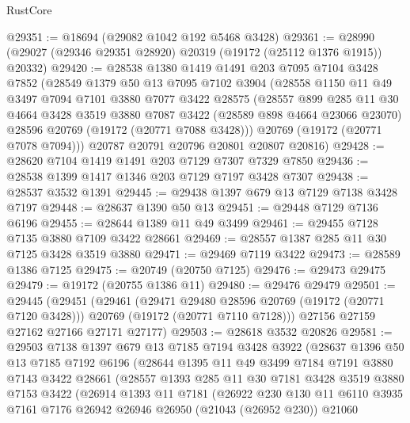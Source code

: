 \begin{lexlean}{RustCore}
\begin{coremodule}
@29351 := @18694 (@29082 @1042 @192 @5468 @3428)
@29361 := @28990 (@29027 (@29346 @29351 @28920) @20319 (@19172 (@25112 @1376 @1915)) @20332)
@29420 := @28538
    @1380
    @1419
    @1491
    @203
    @7095
    @7104
    @3428
    @7852
    (@28549
      @1379
      @50
      @13
      @7095
      @7102
      @3904
      (@28558
        @1150
        @11
        @49
        @3497
        @7094
        @7101
        @3880
        @7077
        @3422
        @28575
        (@28557
          @899
          @285
          @11
          @30
          @4664
          @3428
          @3519
          @3880
          @7087
          @3422
          (@28589 @898 @4664 @23066 @23070)
          @28596
          @20769
          (@19172 (@20771 @7088 @3428)))
        @20769
        (@19172 (@20771 @7078 @7094)))
      @20787
      @20791
      @20796
      @20801
      @20807
      @20816)
@29428 := @28620 @7104 @1419 @1491 @203 @7129 @7307 @7329 @7850
@29436 := @28538 @1399 @1417 @1346 @203 @7129 @7197 @3428 @7307
@29438 := @28537 @3532 @1391
@29445 := @29438 @1397 @679 @13 @7129 @7138 @3428 @7197
@29448 := @28637 @1390 @50 @13
@29451 := @29448 @7129 @7136 @6196
@29455 := @28644 @1389 @11 @49 @3499
@29461 := @29455 @7128 @7135 @3880 @7109 @3422 @28661
@29469 := @28557 @1387 @285 @11 @30 @7125 @3428 @3519 @3880
@29471 := @29469 @7119 @3422
@29473 := @28589 @1386 @7125
@29475 := @20749 (@20750 @7125)
@29476 := @29473 @29475
@29479 := @19172 (@20755 @1386 @11)
@29480 := @29476 @29479
@29501 := @29445
    (@29451
      (@29461
        (@29471 @29480 @28596 @20769 (@19172 (@20771 @7120 @3428)))
        @20769
        (@19172 (@20771 @7110 @7128)))
      @27156
      @27159
      @27162
      @27166
      @27171
      @27177)
@29503 := @28618 @3532 @20826
@29581 := @29503
    @7138
    @1397
    @679
    @13
    @7185
    @7194
    @3428
    @3922
    (@28637
      @1396
      @50
      @13
      @7185
      @7192
      @6196
      (@28644
        @1395
        @11
        @49
        @3499
        @7184
        @7191
        @3880
        @7143
        @3422
        @28661
        (@28557
          @1393
          @285
          @11
          @30
          @7181
          @3428
          @3519
          @3880
          @7153
          @3422
          (@26914
            @1393
            @11
            @7181
            (@26922
              @230
              @130
              @11
              @6110
              @3935
              @7161
              @7176
              @26942
              @26946
              @26950
              (@21043 (@26952 @230))
              @21060

\end{coremodule}
\end{lexlean}
